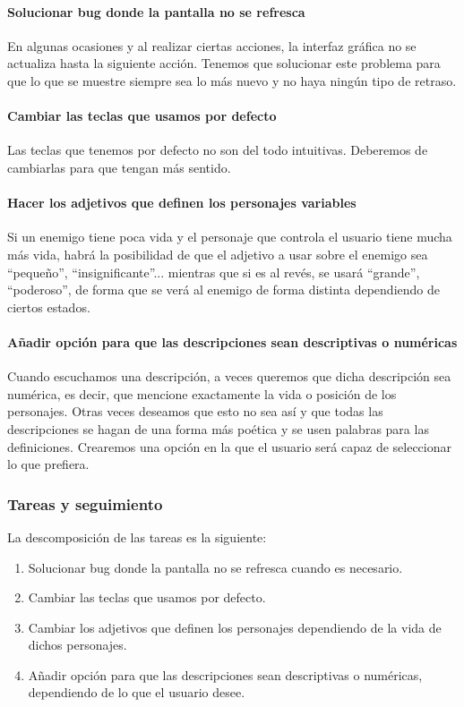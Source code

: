 \paragraph{Solucionar bug donde la pantalla no se refresca} En algunas ocasiones y al realizar ciertas acciones, la interfaz gráfica no se actualiza hasta la siguiente acción. Tenemos que solucionar este problema para que lo que se muestre siempre sea lo más nuevo y no haya ningún tipo de retraso.

\paragraph{Cambiar las teclas que usamos por defecto} Las teclas que tenemos por defecto no son del todo intuitivas. Deberemos de cambiarlas para que tengan más sentido.

\paragraph{Hacer los adjetivos que definen los personajes variables} Si un enemigo tiene poca vida y el personaje que controla el usuario tiene mucha más vida, habrá la posibilidad de que el adjetivo a usar sobre el enemigo sea ``pequeño'', ``insignificante''... mientras que si es al revés, se usará ``grande'', ``poderoso'', de forma que se verá al enemigo de forma distinta dependiendo de ciertos estados.

\paragraph{Añadir opción para que las descripciones sean descriptivas o numéricas} Cuando escuchamos una descripción, a veces queremos que dicha descripción sea numérica, es decir, que mencione exactamente la vida o posición de los personajes. Otras veces deseamos que esto no sea así y que todas las descripciones se hagan de una forma más poética y se usen palabras para las definiciones. Crearemos una opción en la que el usuario será capaz de seleccionar lo que prefiera.

\subsubsection{Tareas y seguimiento}

La descomposición de las tareas es la siguiente:

\begin{enumerate}[label=\bfseries WBS 7.\arabic*]
  \item Solucionar bug donde la pantalla no se refresca cuando es necesario.
  \item Cambiar las teclas que usamos por defecto.
  \item Cambiar los adjetivos que definen los personajes dependiendo de la vida de dichos personajes.
  \item Añadir opción para que las descripciones sean descriptivas o numéricas, dependiendo de lo que el usuario desee.
\end{enumerate}


